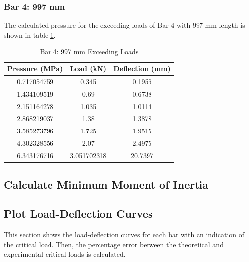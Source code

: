 \documentclass[12pt, titlepage]{article}
\begin{document}
\subsubsection{Bar 4: 997 mm}
The calculated pressure for the exceeding loads of Bar 4 with 997 mm length
is shown in table \ref{tab:bar4exceed}.
\begin{table}[H]
    \centering
    \caption{Bar 4: 997 mm Exceeding Loads}
    \label{tab:bar4exceed}
    \begin{tabular}{|c|c|c|}
        \hline
        \textbf{Pressure (MPa)} & \textbf{Load (kN)} & \textbf{Deflection (mm)}\\
        \hline
        0.717054759 & 0.345 & 0.1956 \\
        \hline
        1.434109519 & 0.69 & 0.6738 \\
        \hline
        2.151164278 & 1.035 & 1.0114 \\
        \hline
        2.868219037 & 1.38 & 1.3878 \\
        \hline
        3.585273796 & 1.725 & 1.9515 \\
        \hline
        4.302328556 & 2.07 & 2.4975 \\
        \hline
        6.343176716 & 3.051702318 & 20.7397 \\
        \hline
    \end{tabular}
\end{table}
\subsection{Calculate Minimum Moment of Inertia}
\subsection{Plot Load-Deflection Curves}
This section shows the load-deflection curves for each bar with an indication
of the critical load. Then, the percentage error between the theoretical and
experimental critical loads is calculated.
\end{document}

